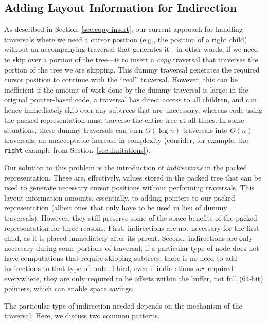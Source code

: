 \documentclass[a4paper,english]{lipics-v2016}
\begin{document}
\subsection{Adding Layout Information for Indirection}

As described in Section~\ref{sec:copy-insert}, our current approach for
handling traversals where we need a cursor position (e.g., the position of a
right child) without an accompanying traversal that generates it---in other
words, if we need to skip over a portion of the tree---is to insert a {\em
copy} traversal that traverses the portion of the tree we are skipping. This
dummy traversal generates the required cursor position to continue with the
``real'' traversal. However, this can be inefficient if the amount of work
done by the dummy traversal is large: in the original pointer-based code, a
traversal has direct access to all children, and can hence immediately skip
over any subtrees that are unecessary, whereas code using the packed
representation must traverse the entire tree at all times. In some situations,
these dummy traversals can turn $O(\log n)$ traversals into $O(n)$ traversals,
an unacceptable increase in complexity (consider, for example, the {\tt right} example from Section~\ref{sec:limitations}).


Our solution to this problem is the introduction of {\em indirections} in the
packed representation. These are, effectively, values stored in the packed
tree that can be used to generate necessary cursor positions without
performing traversals. This layout information amounts, essentially, to adding
pointers to our packed representation (albeit ones that only have to be used
in lieu of dummy traversals). However, they still preserve some of the space
benefits of the packed representation for three reasons. First, indirections
are not necessary for the first child, as it is placed immediately after its
parent. Second, indirections are
only necessary during some portions of traversal; if a particular type of node
does not have computations that require skipping subtrees, there is no need to
add indirections to that type of node. Third, even if indirections {\em are}
required everywhere, they are only required to be offsets within the buffer,
not full (64-bit) pointers, which can enable space savings.

The particular type of indirection needed depends on the mechanism of the
traversal. Here,
we discuss two common patterns.
\end{document}
